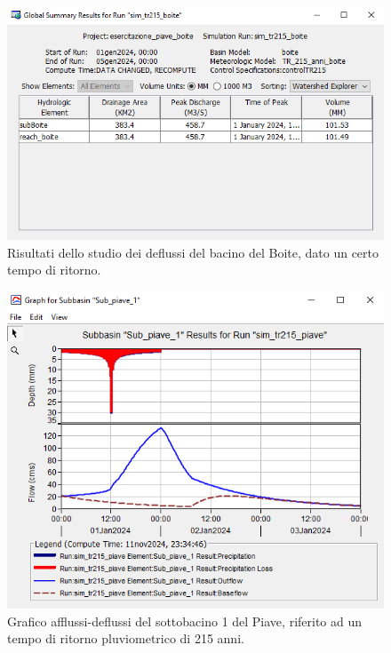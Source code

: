 \begin{figure}[H]\centering
    \includegraphics[scale=1]{immagini/risul_boite_215.PNG}
    \caption{Risultati dello studio dei deflussi del bacino del Boite, dato un certo tempo di ritorno.}
        \label{risul_boite_215}    
    \end{figure}

    \begin{figure}[H]\centering
        \includegraphics[scale=0.9]{immagini/sub1_piave_215.PNG}
        \caption{Grafico afflussi-deflussi del sottobacino 1 del Piave, riferito ad un tempo di ritorno pluviometrico di 215 anni.}
            \label{sub1_piave_215}    
    \end{figure}    

